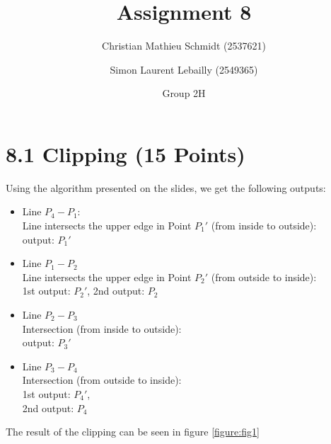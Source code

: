 \documentclass{article}
\title{Assignment 8}
\author{Christian Mathieu Schmidt (2537621)
\and Simon Laurent Lebailly (2549365)\\
\and Group 2H}
\begin{document}
\maketitle


\section*{8.1 Clipping (15 Points)} \label{ex1}

Using the algorithm presented on the slides, we get the following outputs:
\begin{itemize}
    \item Line $P_4 - P_1$:\\
    Line intersects the upper edge in Point $P_1'$ (from inside to outside):\\
    output: $P_1'$
    
    \item Line $P_1 - P_2$\\
    Line intersects the upper edge in Point $P_2'$ (from outside to inside):\\
    1st output: $P_2'$,
    2nd output: $P_2$
    
    \item Line $P_2 - P_3$\\
    Intersection (from inside to outside):\\
    output: $P_3'$
    
    \item Line $P_3 - P_4$\\
    Intersection (from outside to inside):\\
    1st output: $P_4'$,\\
    2nd output: $P_4$
\end{itemize}
The result of the clipping can be seen in figure \autoref{figure:fig1}
\end{document}
